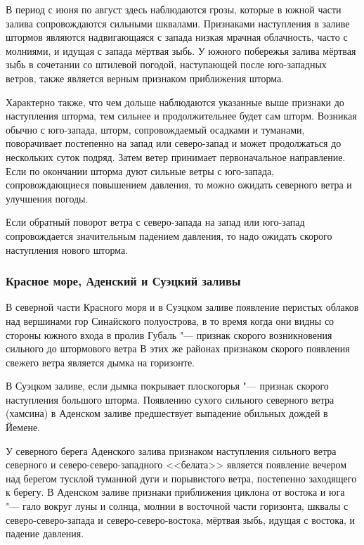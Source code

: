 В период с июня по август здесь наблюдаются грозы, которые в южной
части залива сопровождаются сильными шквалами. Признаками наступления
в заливе штормов являются надвигающаяся с запада низкая мрачная
облачность, часто с молниями, и идущая с запада мёртвая зыбь. У южного
побережья залива мёртвая зыбь в сочетании со штилевой погодой,
наступающей после юго-западных ветров, также является верным признаком
приближения шторма.

Характерно также, что чем дольше наблюдаются указанные выше признаки
до наступления шторма, тем сильнее и продолжительнее будет сам
шторм. Возникая обычно с юго-запада, шторм, сопровождаемый осадками и
туманами, поворачивает постепенно на запад или северо-запад и может
продолжаться до нескольких суток подряд. Затем ветер принимает
первоначальное направление. Если по окончании шторма дуют сильные
ветры с юго-запада, сопровождающиеся повышением давления, то можно
ожидать северного ветра и улучшения погоды.

Если обратный поворот ветра с северо-запада на запад или юго-запад
сопровождается значительным падением давления, то надо ожидать скорого
наступления нового шторма.

\subsubsection{Красное море, Аденский и Суэцкий заливы}

В северной части Красного моря и в Суэцком заливе появление перистых
облаков над вершинами гор Синайского полуострова, в то время когда они
видны со стороны южного входа в пролив Губаль "--- признак скорого
возникновения сильного до штормового ветра В этих же районах признаком
скорого появления свежего ветра является дымка на горизонте.

В Суэцком заливе, если дымка покрывает плоскогорья "--- признак скорого
наступления большого шторма. Появлению сухого сильного северного ветра
(хамсина) в Аденском заливе предшествует выпадение обильных дождей в
Йемене.

У северного берега Аденского залива признаком наступления сильного
ветра северного и северо-северо-западного <<белата>> является появление
вечером над берегом тусклой туманной дуги и порывистого ветра,
постепенно заходящего к берегу. В Аденском заливе признаки приближения
циклона от востока и юга "--- гало вокруг луны и солнца, молнии в
восточной части горизонта, шквалы с северо-северо-запада и
северо-северо-востока, мёртвая зыбь, идущая с востока, и падение
давления.

